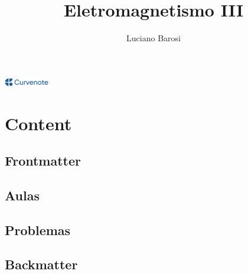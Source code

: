 \documentclass{article}
\title{Eletromagnetismo III}
\author{Luciano Barosi}
\date{\displaydate{articleDate}}
\newcommand{\logo}{
  \href{https://curvenote.com}{\includegraphics[width=2cm]{curvenote.png}}
}
\begin{document}
\maketitle
\begin{center}\logo\end{center}


\section{Content}

\subsection{Frontmatter}





\subsection{Aulas}

\subsection{Problemas}





\subsection{Backmatter}
\end{document}
